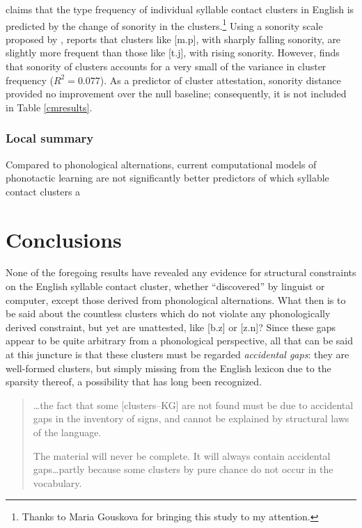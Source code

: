 \subsubsection{\citealt{McGowan2009}}

\citet{McGowan2009} claims that the type frequency of individual syllable contact clusters in English is predicted by the change of sonority in the clusters.\footnote{Thanks to Maria Gouskova for bringing this study to my attention.} Using a sonority scale proposed by \citet{Jespersen1904}, \citeauthor{McGowan2009} reports that clusters like [m.p], with sharply falling sonority, are slightly more frequent than those like [t.j], with rising sonority. However, \citeauthor{McGowan2009} finds that sonority of clusters accounts for a very small of the variance in cluster frequency ($R^2 = 0.077$). As a predictor of cluster attestation, sonority distance provided no improvement over the null baseline; consequently, it is not included in Table \ref{cmresults}.

\subsubsection{Local summary}

Compared to phonological alternations, current computational models of phonotactic learning are not significantly better predictors of which syllable contact clusters a

\section{Conclusions}

None of the foregoing results have revealed any evidence for structural constraints on the English syllable contact cluster, whether ``discovered'' by linguist or computer, except those derived from phonological alternations. What then is to be said about the countless clusters which do not violate any phonologically derived constraint, but yet are unattested, like [b.z] or [z.n]? Since these gaps appear to be quite arbitrary from a phonological perspective, all that can be said at this juncture is that these clusters must be regarded \emph{accidental gaps}: they are well-formed clusters, but simply missing from the English lexicon due to the sparsity thereof, a possibility that has long been recognized.

\begin{quote}
\ldots{}the fact that some [clusters--KG] are not found must be due to accidental gaps in the inventory of signs, and cannot be explained by structural laws of the language. \citep[][16]{Fischer-Jorgensen1952}

The material will never be complete. It will always contain accidental gaps\ldots{}partly because some clusters by pure chance do not occur in the vocabulary. \citep[][30]{Vogt1954}
\end{quote}

